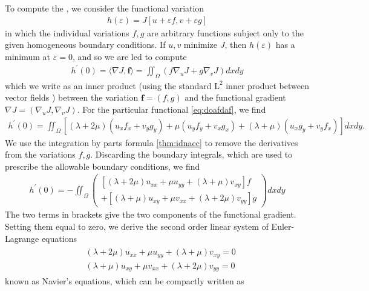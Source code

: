 \documentclass{article}
\begin{document}
\begin{exma}
To compute the , we consider the functional variation
\begin{align*}
h(\varepsilon)=J[u+\varepsilon f, v+\varepsilon g]
\end{align*}
in which the individual variations $f, g$ are arbitrary functions subject only to the given homogeneous boundary conditions. If $u, v$ minimize $J$, then $h(\varepsilon)$ has a minimum at $\varepsilon=0$, and so we are led to compute
\begin{align*}
h^{\prime}(0)=\langle\nabla J, \mathbf{f}\rangle=\iint_{\Omega}\left(f \nabla_{u} J+g \nabla_{v} J\right) d x d y
\end{align*}
which we write as an inner product (using the standard $\mathrm{L}^{2}$ inner product between vector fields ) between the variation $\mathbf{f}=(f,g)$ and the functional gradient $\nabla J=\left(\nabla_{u} J, \nabla_{v} J\right) .$ For the particular functional \cref{eq:doafdaf}, we find
\begin{align*}
h^{\prime}(0)=\iint_{\Omega}\left[(\lambda+2 \mu)\left(u_{x} f_{x}+v_{y} g_{y}\right)+\mu\left(u_{y} f_{y}+v_{x} g_{x}\right)+(\lambda+\mu)\left(u_{x} g_{y}+v_{y} f_{x}\right)\right] d x d y .
\end{align*}
We use the integration by parts formula \cref{thm:idnacc} to remove the derivatives from the variations $f, g .$ Discarding the boundary integrals, which are used to prescribe the allowable boundary conditions, we find
\begin{align*}
h^{\prime}(0)=-\iint_{\Omega}\left(\begin{array}{r}
{\left[(\lambda+2 \mu) u_{x x}+\mu u_{y y}+(\lambda+\mu) v_{x y}\right] f} \\
+\left[(\lambda+\mu) u_{x y}+\mu v_{x x}+(\lambda+2 \mu) v_{y y}\right] g
\end{array}\right) d x d y
\end{align*}
The two terms in brackets give the two components of the functional gradient. Setting them equal to zero, we derive the second order linear system of Euler-Lagrange equations
\begin{align*}
\begin{aligned}
&(\lambda+2 \mu) u_{x x}+\mu u_{y y}+(\lambda+\mu) v_{x y}=0 \\
&(\lambda+\mu) u_{x y}+\mu v_{x x}+(\lambda+2 \mu) v_{y y}=0
\end{aligned}
\end{align*}
known as Navier's equations, which can be compactly written as
\begin{align*}

\end{align*}
\end{exma}
\end{document}
